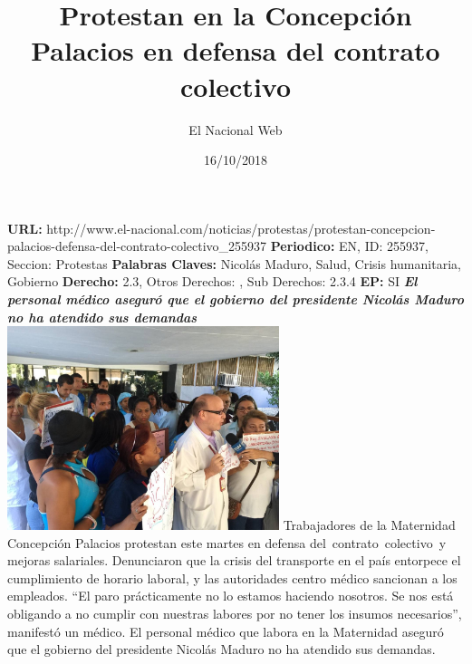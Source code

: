 \documentclass{article}%
\title{\textbf{Protestan en la Concepción Palacios en defensa del contrato colectivo}}%
\author{El Nacional Web}%
\date{16/10/2018}%
\begin{document}
%
\normalsize%
\maketitle%
\textbf{URL: }%
http://www.el{-}nacional.com/noticias/protestas/protestan{-}concepcion{-}palacios{-}defensa{-}del{-}contrato{-}colectivo\_255937\newline%
%
\textbf{Periodico: }%
EN, %
ID: %
255937, %
Seccion: %
Protestas\newline%
%
\textbf{Palabras Claves: }%
Nicolás Maduro, Salud, Crisis humanitaria, Gobierno\newline%
%
\textbf{Derecho: }%
2.3, %
Otros Derechos: %
, %
Sub Derechos: %
2.3.4\newline%
%
\textbf{EP: }%
SI\newline%
\newline%
%
\textbf{\textit{El personal médico aseguró que el gobierno del presidente Nicolás Maduro no ha atendido sus demandas}}%
\newline%
\newline%
%
\includegraphics[width=300px]{88.jpg}%
\newline%
%
Trabajadores de la Maternidad Concepción Palacios protestan este martes en defensa del~contrato~colectivo~y mejoras salariales.%
\newline%
%
Denunciaron que la crisis del transporte en el país entorpece el cumplimiento de horario laboral, y las autoridades centro médico sancionan a los empleados.%
\newline%
%
“El paro prácticamente no lo estamos haciendo nosotros. Se nos está obligando a no cumplir con nuestras labores por no tener los insumos necesarios”, manifestó un médico.%
\newline%
%
El personal médico que labora en la Maternidad aseguró que el gobierno del presidente Nicolás Maduro no ha atendido sus demandas.%
\newline%
%
\end{document}
